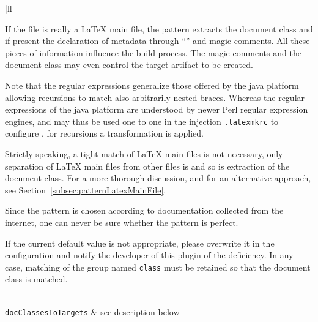 \begin{longtable}{|ll|}
{\begin{minipage}{0.95\linewidth}
If the file is really a \LaTeX{} main file, 
the pattern extracts the document class and 
if present the declaration of metadata through ``'' 
and magic comments. 
All these pieces of information influence the build process. 
The magic comments and the document class may even control the target artifact to be created. 

Note that the regular expressions generalize those offered by the java platform 
allowing recursions to match also arbitrarily nested braces. 
Whereas the regular expressions of the java platform are understood by newer Perl regular expression engines, 
and may thus be used one to one in the injection \texttt{.latexmkrc} to configure , 
for recursions a transformation is applied. 

Strictly speaking, a tight match of \LaTeX{} main files is not necessary, 
only separation of \LaTeX{} main files from other files is 
and so is extraction of the document class. 
For a more thorough discussion, 
and for an alternative approach, see Section~\ref{subsec:patternLatexMainFile}. 

Since the pattern is chosen 
according to documentation collected from the internet, 
one can never be sure whether the pattern is perfect. 

If the current default value is not appropriate, 
please overwrite it in the configuration 
and notify the developer of this plugin of the deficiency. 
In any case, matching of the group named \texttt{class} must be retained 
so that the document class is matched. 
\end{minipage}
} \\
\texttt{docClassesToTargets} & see description below  \\
\end{longtable}
